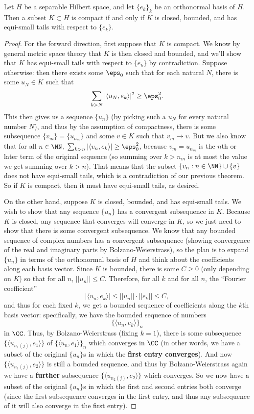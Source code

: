 \begin{theorem} 
Let $H$ be a separable Hilbert space, and let $\{e_k\}_k$ be an orthonormal basis of $H$. Then a subset $K \subset H$ is compact if and only if $K$ is closed, bounded, and has equi-small tails with respect to $\{e_k\}$.
\end{theorem}
\begin{proof}
For the forward direction, first suppose that $K$ is compact. We know by general metric space theory that $K$ is then closed and bounded, and we'll show that $K$ has equi-small tails with respect to $\{e_k\}$ by contradiction. Suppose otherwise: then there exists some $\eps_0$ such that for each natural $N$, there is some $u_N \in K$ such that
\[
     \sum_{k>N} |\langle u_N, e_k \rangle|^2 \ge \eps_0^2.
\]
This then gives us a sequence $\{u_n\}$ (by picking such a $u_N$ for every natural number $N$), and thus by the assumption of compactness, there is some subsequence $\{v_m\} = \{u_{n_m}\}$ and some $v \in K$ such that $v_m \to v$. But we also know that for all $n \in \NN$, $\sum_{k>n} |\langle v_n, e_k \rangle| \ge \eps_0^2$, because $v_m = u_{n_m}$ is the $n$th or later term of the original sequence (so summing over $k > n_m$ is at most the value we get summing over $k > n$). That means that the subset $\{v_n: n \in \NN\} \cup \{v\}$ does not have equi-small tails, which is a contradiction of our previous theorem. So if $K$ is compact, then it must have equi-small tails, as desired. 

On the other hand, suppose $K$ is closed, bounded, and has equi-small tails. We wish to show that any sequence $\{u_n\}$ has a convergent subsequence in $K$. Because $K$ is closed, any sequence that converges will converge in $K$, so we just need to show that there is some convergent subsequence. We know that any bounded sequence of complex numbers has a convergent subsequence (showing convergence of the real and imaginary parts by Bolzano-Weierstrass), so the plan is to expand $\{u_n\}$ in terms of the orthonormal basis of $H$ and think about the coefficients along each basis vector. Since $K$ is bounded, there is some $C \ge 0$ (only depending on $K$) so that for all $n$, $||u_n|| \le C$. Therefore, for all $k$ and for all $n$, the ``Fourier coefficient'' 
\[
    |\langle u_n, e_k \rangle| \le ||u_n|| \cdot ||e_k|| \le C,
\]
and thus for each fixed $k$, we get a bounded sequence of coefficients along the $k$th basis vector: specifically, we have the bounded sequence of numbers
\[
    \{\langle u_n, e_k \rangle\}_n
\]
in $\CC$. Thus, by Bolzano-Weierstrass (fixing $k = 1$), there is some subsequence $\{\langle u_{n_1(j)}, e_1 \rangle\}$ of $\{\langle u_n, e_1 \rangle\}_n$ which converges in $\CC$ (in other words, we have a subset of the original $\{u_n\}$s in which the \textbf{first entry converges}). And now $\{\langle u_{n_1(j)}, e_2 \rangle\}$ is still a bounded sequence, and thus by Bolzano-Weierstrass again we have a \textbf{further} subsequence $\{\langle u_{n_2(j)}, e_2 \rangle\}$ which converges. So we now have a subset of the original $\{u_n\}$s in which the first and second entries both converge (since the first subsequence converges in the first entry, and thus any subsequence of it will also converge in the first entry).


\end{proof}
